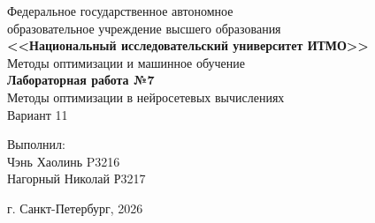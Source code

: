 \begin{titlepage}
    \centering
    Федеральное государственное автономное \\
    образовательное учреждение высшего образования \\
    \textbf{<<Национальный исследовательский университет ИТМО>>} \\

    \vfill
    Методы оптимизации и машинное обучение \\
    \vspace{0.5\baselineskip}
    \textbf{Лабораторная работа №7} \\
    \vspace{0.5\baselineskip}
    Методы оптимизации в нейросетевых вычислениях \\
    \vspace{0.5\baselineskip}
    Вариант 11 \\

    \vfill

    \flushright
    Выполнил:\\
    Чэнь Хаолинь P3216\\
    Нагорный Николай Р3217\\

    \vspace{4\baselineskip}

    \centering
    г. Санкт-Петербург, 2026

\end{titlepage}
